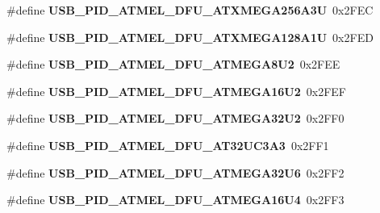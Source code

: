 \begin{DoxyCompactItemize}
\#define {\bfseries U\+S\+B\+\_\+\+P\+I\+D\+\_\+\+A\+T\+M\+E\+L\+\_\+\+D\+F\+U\+\_\+\+A\+T\+X\+M\+E\+G\+A256\+A3U}~0x2\+F\+EC
\item 
\mbox{\label{group__usb__atmel__ids__group_ga32e006da9657814df37d3c22dbb4c90c}} 
\#define {\bfseries U\+S\+B\+\_\+\+P\+I\+D\+\_\+\+A\+T\+M\+E\+L\+\_\+\+D\+F\+U\+\_\+\+A\+T\+X\+M\+E\+G\+A128\+A1U}~0x2\+F\+ED
\item 
\mbox{\label{group__usb__atmel__ids__group_ga68f5b8a39ac712a611f1140d80b9b58c}} 
\#define {\bfseries U\+S\+B\+\_\+\+P\+I\+D\+\_\+\+A\+T\+M\+E\+L\+\_\+\+D\+F\+U\+\_\+\+A\+T\+M\+E\+G\+A8\+U2}~0x2\+F\+EE
\item 
\mbox{\label{group__usb__atmel__ids__group_ga208651a2d251f01e52d9b7c51b6f9250}} 
\#define {\bfseries U\+S\+B\+\_\+\+P\+I\+D\+\_\+\+A\+T\+M\+E\+L\+\_\+\+D\+F\+U\+\_\+\+A\+T\+M\+E\+G\+A16\+U2}~0x2\+F\+EF
\item 
\mbox{\label{group__usb__atmel__ids__group_gacd8db8dbfd7130716e4bee4606ab8729}} 
\#define {\bfseries U\+S\+B\+\_\+\+P\+I\+D\+\_\+\+A\+T\+M\+E\+L\+\_\+\+D\+F\+U\+\_\+\+A\+T\+M\+E\+G\+A32\+U2}~0x2\+F\+F0
\item 
\mbox{\label{group__usb__atmel__ids__group_gaa11f6d95a0888b0f8defad9cbf78fc65}} 
\#define {\bfseries U\+S\+B\+\_\+\+P\+I\+D\+\_\+\+A\+T\+M\+E\+L\+\_\+\+D\+F\+U\+\_\+\+A\+T32\+U\+C3\+A3}~0x2\+F\+F1
\item 
\mbox{\label{group__usb__atmel__ids__group_gaffc46609cff6a77aeb4393e31feaea05}} 
\#define {\bfseries U\+S\+B\+\_\+\+P\+I\+D\+\_\+\+A\+T\+M\+E\+L\+\_\+\+D\+F\+U\+\_\+\+A\+T\+M\+E\+G\+A32\+U6}~0x2\+F\+F2
\item 
\mbox{\label{group__usb__atmel__ids__group_ga2d071c4d544362684d714866bcf71543}} 
\#define {\bfseries U\+S\+B\+\_\+\+P\+I\+D\+\_\+\+A\+T\+M\+E\+L\+\_\+\+D\+F\+U\+\_\+\+A\+T\+M\+E\+G\+A16\+U4}~0x2\+F\+F3
\item 
\mbox{\label{group__usb__atmel__ids__group_gacc8564e7fe5ed97397f9e29bb1dd1da6}} 

\end{DoxyCompactItemize}
